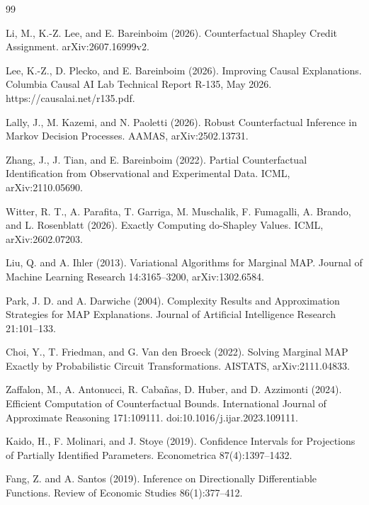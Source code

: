 \documentclass{article}
\begin{document}
\begin{thebibliography}{99}

   Li, M., K.-Z. Lee, and E. Bareinboim (2026). Counterfactual Shapley Credit Assignment. arXiv:2607.16999v2.

   Lee, K.-Z., D. Plecko, and E. Bareinboim (2026). Improving Causal Explanations. Columbia Causal AI Lab Technical Report R-135, May 2026. https://causalai.net/r135.pdf.

   Lally, J., M. Kazemi, and N. Paoletti (2026). Robust Counterfactual Inference in Markov Decision Processes. AAMAS, arXiv:2502.13731.

   Zhang, J., J. Tian, and E. Bareinboim (2022). Partial Counterfactual Identification from Observational and Experimental Data. ICML, arXiv:2110.05690.

   Witter, R. T., A. Parafita, T. Garriga, M. Muschalik, F. Fumagalli, A. Brando, and L. Rosenblatt (2026). Exactly Computing do-Shapley Values. ICML, arXiv:2602.07203.

   Liu, Q. and A. Ihler (2013). Variational Algorithms for Marginal MAP. Journal of Machine Learning Research 14:3165--3200, arXiv:1302.6584.

   Park, J. D. and A. Darwiche (2004). Complexity Results and Approximation Strategies for MAP Explanations. Journal of Artificial Intelligence Research 21:101--133.

   Choi, Y., T. Friedman, and G. Van den Broeck (2022). Solving Marginal MAP Exactly by Probabilistic Circuit Transformations. AISTATS, arXiv:2111.04833.

   Zaffalon, M., A. Antonucci, R. Cabañas, D. Huber, and D. Azzimonti (2024). Efficient Computation of Counterfactual Bounds. International Journal of Approximate Reasoning 171:109111. doi:10.1016/j.ijar.2023.109111.

   Kaido, H., F. Molinari, and J. Stoye (2019). Confidence Intervals for Projections of Partially Identified Parameters. Econometrica 87(4):1397--1432.

   Fang, Z. and A. Santos (2019). Inference on Directionally Differentiable Functions. Review of Economic Studies 86(1):377--412.


\end{thebibliography}
\end{document}
